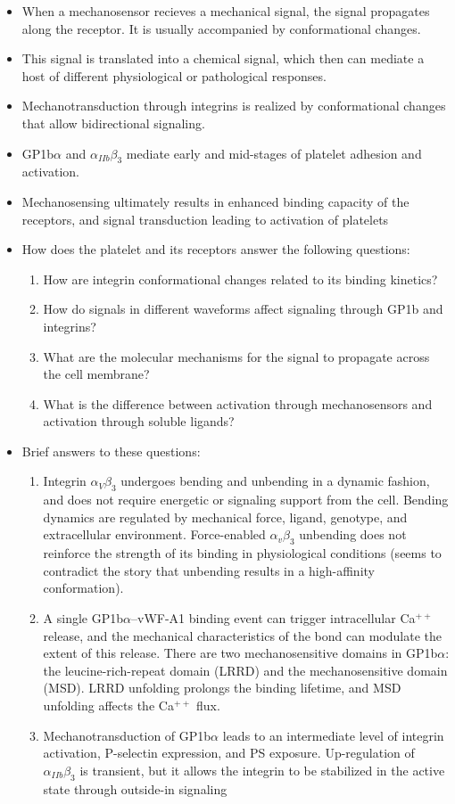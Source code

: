\documentclass[
10pt, %
letterpaper, %
twocolumn, %
landscape %
]{article}
\begin{document}
\begin{itemize}
\item When a mechanosensor recieves a mechanical signal, the signal
  propagates along the receptor. It is usually accompanied by
  conformational changes.
\item This signal is translated into a chemical signal, which then can
  mediate a host of different physiological or pathological responses.
\item Mechanotransduction through integrins is realized by
  conformational changes that allow bidirectional signaling.
\item GP1b$\alpha$ and $\alpha_{IIb} \beta_3$ mediate early and
  mid-stages of platelet adhesion and activation.
\item Mechanosensing ultimately results in enhanced binding capacity
  of the receptors, and signal transduction leading to activation of
  platelets
\item How does the platelet and its receptors answer the following
  questions:
  \begin{enumerate}
  \item How are integrin conformational changes related to its binding
    kinetics? 
  \item How do signals in different waveforms affect signaling through
    GP1b and integrins?
  \item What are the molecular mechanisms for the signal to propagate
    across the cell membrane?
  \item What is the difference between activation through
    mechanosensors and activation through soluble ligands?
  \end{enumerate}
\item Brief answers to these questions:
  \begin{enumerate}
  \item Integrin $\alpha_V \beta_3$ undergoes bending and unbending in
    a dynamic fashion, and does not require energetic or signaling
    support from the cell. Bending dynamics are regulated by
    mechanical force, ligand, genotype, and extracellular
    environment. Force-enabled $\alpha_v \beta_3$ unbending does not
    reinforce the strength of its binding in physiological conditions
    (seems to contradict the story that unbending results in a
    high-affinity conformation).
  \item A single GP1b$\alpha$--vWF-A1 binding event can trigger
    intracellular Ca$^{++}$ release, and the mechanical
    characteristics of the bond can modulate the extent of this
    release. There are two mechanosensitive domains in GP1b$\alpha$:
    the leucine-rich-repeat domain (LRRD) and the mechanosensitive
    domain (MSD). LRRD unfolding prolongs the binding lifetime, and
    MSD unfolding affects the Ca$^{++}$ flux.
  \item Mechanotransduction of GP1b$\alpha$ leads to an intermediate
    level of integrin activation, P-selectin expression, and PS
    exposure. Up-regulation of $\alpha_{IIb} \beta_3$ is transient,
    but it allows the integrin to be stabilized in the active state
    through outside-in signaling
  \end{enumerate}
\end{itemize}
\end{document}
